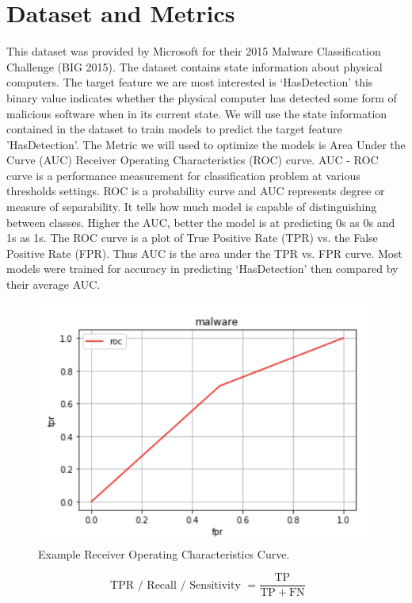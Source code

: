 \documentclass[sigconf]{acmart}
\begin{document}
\section{Dataset and Metrics}
This dataset was provided by Microsoft for their 2015 Malware Classification Challenge (BIG 2015). The dataset contains state information about physical computers. The target feature we are most interested is `HasDetection' this binary value indicates whether the physical computer has detected some form of malicious software when in its current state. We will use the state information contained in the dataset to train models to predict the target feature 'HasDetection'. The Metric we will used to optimize the models is Area Under the Curve (AUC) Receiver Operating Characteristics (ROC) curve. AUC - ROC curve is a performance measurement for classification problem at various thresholds settings. ROC is a probability curve and AUC represents degree or measure of separability. It tells how much model is capable of distinguishing between classes. Higher the AUC, better the model is at predicting 0s as 0s and 1s as 1s. \cite{AUC:2018} The ROC curve is a plot of True Positive Rate (TPR) vs. the False Positive Rate (FPR). Thus AUC is the area under the TPR vs. FPR curve. Most models were trained for accuracy in predicting `HasDetection' then compared by their average AUC.

 \begin{figure}
  \includegraphics[width=\linewidth]{example-ROC.PNG}
  \caption{Example Receiver Operating Characteristics Curve.}
  \label{fig:roc}
\end{figure}

\begin{equation}
\text { TPR / Recall / Sensitivity }=\frac{\text { TP }}{\mathrm{TP}+\mathrm{FN}}
\end{equation}
\end{document}
